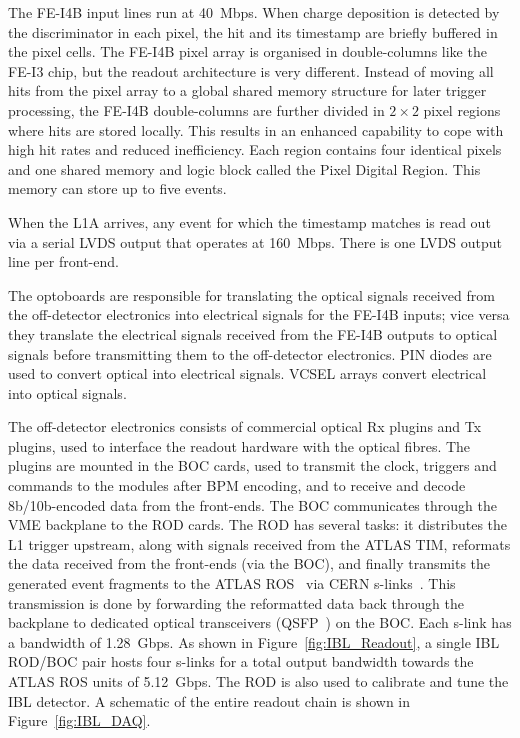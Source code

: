 \documentclass[cernpreprint, atlasdraft=false, UKenglish,british,orcidlogo, texmf, orcidlogo]{atlasdoc}
\begin{document}
The FE-I4B input lines run at \SI{40}{Mbps}. When charge deposition is detected by the discriminator in each pixel, the hit and its timestamp are briefly buffered in the pixel cells. The FE-I4B pixel array is organised in double-columns like the FE-I3 chip, but the readout architecture is very different. Instead of moving all hits from the pixel array to a global shared memory structure for later trigger processing, the FE-I4B double-columns are further divided in $2\times 2$ pixel regions where hits are stored locally. This results in an enhanced capability to cope with high hit rates and reduced inefficiency. Each region contains four identical \analog pixels and one shared memory and logic block called the Pixel Digital Region. This memory can store up to five events.
 
When the \gls{L1A} arrives, any event for which the timestamp matches is read out via a serial \gls{LVDS} output
that operates at \SI{160}{Mbps}. There is one \gls{LVDS} output line per front-end.
 
The optoboards are responsible for translating the optical signals received from the off-detector electronics into electrical signals for the FE-I4B inputs; vice versa they translate the electrical signals received from the FE-I4B outputs to optical signals before transmitting them to the off-detector electronics.
\gls{PIN} diodes are used to convert optical into electrical signals. \gls{VCSEL} arrays convert electrical into optical signals.
 
 
The off-detector electronics consists of commercial optical \gls{Rx} plugins and \gls{Tx} plugins, used to interface the readout hardware with the optical fibres. The plugins are mounted in the \gls{BOC} cards, used to transmit  the clock, triggers and commands to the modules after \gls{BPM} encoding, and to receive and decode 8b/10b-encoded data from the front-ends. The \gls{BOC} communicates through the \gls{VME} backplane to the \gls{ROD} cards. The \gls{ROD} has several tasks: it distributes the \gls{L1} trigger upstream, along with signals received from the ATLAS \gls{TIM}, reformats the data received from the front-ends (via the \gls{BOC}), and finally transmits the generated event fragments to the ATLAS \gls{ROS}~\cite{ROS} via CERN \glspl{s-link}~\cite{slink}.
This transmission is done by forwarding the reformatted data back through the backplane to dedicated optical transceivers (\gls{QSFP}~\cite{QSFP}) on the \gls{BOC}.
Each \gls{s-link} has a bandwidth of \SI{1.28}{Gbps}. As shown in Figure~\ref{fig:IBL_Readout}, a single \gls{IBL} \gls{ROD}/\gls{BOC} pair hosts four \glspl{s-link} 
for a total output bandwidth towards the ATLAS \gls{ROS} units of \SI{5.12}{Gbps}.
The \gls{ROD} is also used to calibrate and tune the \gls{IBL} detector.
A schematic of the entire readout chain is shown in Figure~\ref{fig:IBL_DAQ}.
 
\end{document}
